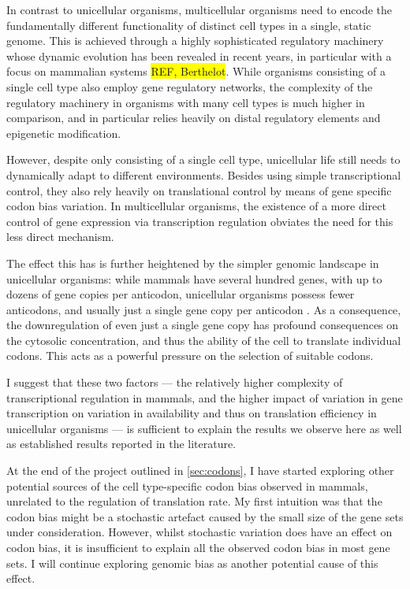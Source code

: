 In contrast to unicellular organisms, multicellular organisms need to encode the
fundamentally different functionality of distinct cell types in a single, static
genome. This is achieved through a highly sophisticated regulatory machinery
whose dynamic evolution has been revealed in recent years, in particular with a
focus on mammalian systems \colorbox{yellow}{REF, Berthelot}. While  organisms
consisting of a single cell type also employ gene regulatory networks, the
complexity of the regulatory machinery in organisms with many cell types is much
higher in comparison, and in particular relies heavily on distal regulatory
elements and epigenetic modification.

However, despite only consisting of a single cell type, unicellular life still
needs to dynamically adapt to different environments. Besides using simple
transcriptional control, they also rely heavily on translational control by
means of gene specific codon bias variation. In multicellular organisms, the
existence of a more direct control of gene expression via transcription
regulation obviates the need for this less direct mechanism.

The effect this has is further heightened by the simpler genomic \trna landscape
in unicellular organisms: while mammals have several hundred \trna genes, with
up to dozens of gene copies per anticodon, unicellular organisms possess fewer
anticodons, and usually just a single \trna gene copy per anticodon
\citep{Chan:2009}. As a consequence, the downregulation of even just a single
\trna gene copy has profound consequences on the cytosolic \trna concentration,
and thus the ability of the cell to translate individual codons. This acts as a
powerful pressure on the selection of suitable codons.

I suggest that these two factors — the relatively higher complexity of
transcriptional regulation in mammals, and the higher impact of variation in
\trna gene transcription on variation in
\trna availability and thus on translation efficiency in unicellular organisms —
is sufficient to explain the results we observe here as well as established
results reported in the literature.

At the end of the project outlined in \cref{sec:codons}, I have started
exploring other potential sources of the cell type-specific codon bias observed
in mammals, unrelated to the regulation of translation rate. My first intuition
was that the codon bias might be a stochastic artefact caused by the small size
of the gene sets under consideration. However, whilst stochastic variation does
have an effect on codon bias, it is insufficient to explain all the observed
codon bias in most gene sets. I will continue exploring genomic \gc bias as
another potential cause of this effect.

